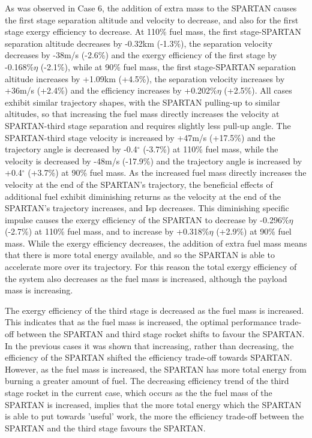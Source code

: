  As was observed in Case 6, the addition of extra mass to the SPARTAN causes the first stage separation altitude and velocity to decrease, and also for the first stage exergy efficiency to decrease. At 110\% fuel mass, the first stage-SPARTAN separation altitude decreases by -0.32km (-1.3\%), the separation velocity decreases by -38m/s (-2.6\%) and the exergy efficiency of the first stage by -0.168\%$\eta$ (-2.1\%), while at 90\% fuel mass, the first stage-SPARTAN separation altitude increases by +1.09km (+4.5\%), the separation velocity increases by +36m/s (+2.4\%) and the efficiency increases by +0.202\%$\eta$ (+2.5\%).
All cases exhibit similar trajectory shapes, with the SPARTAN pulling-up to similar altitudes, so that increasing the fuel mass directly increases the velocity at SPARTAN-third stage separation and requires slightly less pull-up angle. The SPARTAN-third stage velocity is increased by +47m/s (+17.5\%) and the trajectory angle is decreased by -0.4$^\circ$ (-3.7\%) at 110\% fuel mass, while the velocity is decreased by -48m/s (-17.9\%) and the trajectory angle is increased by +0.4$^\circ$ (+3.7\%) at 90\% fuel mass. 
As the increased fuel mass directly increases the velocity at the end of the SPARTAN's trajectory, the beneficial effects of additional fuel exhibit diminishing returns as the velocity at the end of the SPARTAN's trajectory increases, and Isp decreases.
This diminishing specific impulse causes the exergy efficiency of the SPARTAN to decrease by -0.296\%$\eta$ (-2.7\%) at 110\% fuel mass, and to increase by +0.318\%$\eta$ (+2.9\%) at 90\% fuel mass. 
While the exergy efficiency decreases, the addition of extra fuel mass means that there is more total energy available, and so the SPARTAN is able to accelerate more over its trajectory. For this reason the total exergy efficiency of the system also decreases as the fuel mass is increased, although the payload mass is increasing. 

The exergy efficiency of the third stage is decreased as the fuel mass is increased. 
This indicates that as the fuel mass is increased, the optimal performance trade-off between the SPARTAN and third stage rocket shifts to favour the SPARTAN. 
In the previous cases it was shown that increasing, rather than decreasing, the efficiency of the SPARTAN shifted the efficiency trade-off towards SPARTAN. 
However, as the fuel mass is increased, the SPARTAN has more total energy from burning a greater amount of fuel. 
The decreasing efficiency trend of the third stage rocket in the current case, which occurs as the the fuel mass of the SPARTAN is increased, implies that the more total energy which the SPARTAN is able to put towards 'useful' work, the more the efficiency trade-off between the SPARTAN and the third stage favours the SPARTAN. 

